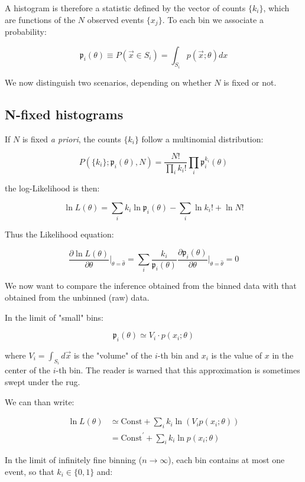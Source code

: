 A histogram is therefore a statistic defined by the vector of counts $\{k_i\}$, which are functions of the $N$ observed events $\{x_j\}$. To each bin we associate a probability:

	\[
		\mathfrak{p}_i(\theta)\equiv P(\vec{x}\in S_i)=\int_{S_i}p(\vec{x};\theta)dx
	\]

We now distinguish two scenarios, depending on whether $N$ is fixed or not.

\subsection{N-fixed histograms}

If $N$ is fixed \emph{a priori}, the counts $\{k_i\}$ follow a multinomial distribution:

	\[
		P(\{k_i\};\mathfrak{p}_i(\theta),N)=\frac{N!}{\prod_i{k_i!}}\prod_i \mathfrak{p}_i^{k_i}(\theta)
	\]
	
the log-Likelihood is then:

	\[
		\ln L(\theta)=\sum_{i}k_i \ln \mathfrak{p}_i(\theta)-\sum_i\ln k_i! + \ln N!
	\]
	
Thus the Likelihood equation:

	\[
		\frac{\partial\ln L(\theta)}{\partial\theta}\bigg\rvert_{\theta=\hat\theta}=\sum_i \frac{k_i}{\mathfrak{p}_i(\theta)}\frac{\partial\mathfrak{p}_i(\theta)}{\partial\theta}\bigg\rvert_{\theta=\hat\theta}=0
	\]

We now want to compare the inference obtained from the binned data with that obtained from the unbinned (raw) data.

In the limit of "small" bins:

	\[
		\mathfrak{p}_i(\theta)\simeq V_i\cdot p(x_i;\theta)
	\]

where $V_i=\int_{S_i}d\vec{x}$ is the "volume" of the $i$-th bin and $x_i$ is the value of $x$ in the center of the $i$-th bin. The reader is warned that this approximation is sometimes swept under the rug. 

We can than write:

\begin{align*}
	\ln L (\theta) &\simeq \text{Const} + \sum_i k_i \ln (V_i p(x_i;\theta)) \\
	&= \text{Const}^\prime + \sum_i k_i \ln p(x_i;\theta)
\end{align*}

In the limit of infinitely fine binning ($n \to \infty$), each bin contains at most one event, so that $k_i \in \{0,1\}$ and:

